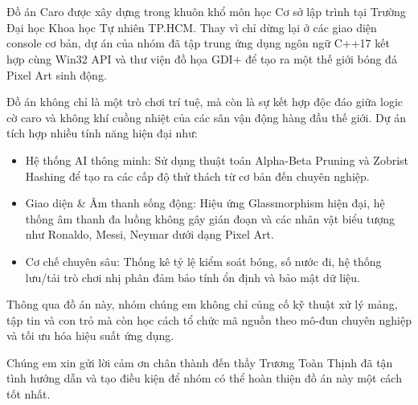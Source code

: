 \newpage
\chapter*{}

\noindent \indent Đồ án Caro được xây dựng trong khuôn khổ môn học Cơ sở lập trình tại Trường Đại học Khoa học Tự nhiên TP.HCM. Thay vì chỉ dừng lại ở các giao diện console cơ bản, dự án của nhóm đã tập trung ứng dụng ngôn ngữ C++17 kết hợp cùng Win32 API và thư viện đồ họa GDI+ để tạo ra một thế giới bóng đá Pixel Art sinh động.

Đồ án không chỉ là một trò chơi trí tuệ, mà còn là sự kết hợp độc đáo giữa logic cờ caro và không khí cuồng nhiệt của các sân vận động hàng đầu thế giới. Dự án tích hợp nhiều tính năng hiện đại như:
\begin{itemize}
    \item Hệ thống AI thông minh: Sử dụng thuật toán Alpha-Beta Pruning và Zobrist Hashing để tạo ra các cấp độ thử thách từ cơ bản đến chuyên nghiệp.

    \item Giao diện \& Âm thanh sống động: Hiệu ứng Glassmorphism hiện đại, hệ thống âm thanh đa luồng không gây gián đoạn và các nhân vật biểu tượng như Ronaldo, Messi, Neymar dưới dạng Pixel Art.

    \item Cơ chế chuyên sâu: Thống kê tỷ lệ kiểm soát bóng, số nước đi, hệ thống lưu/tải trò chơi nhị phân đảm bảo tính ổn định và bảo mật dữ liệu.
\end{itemize}

Thông qua đồ án này, nhóm chúng em không chỉ củng cố kỹ thuật xử lý mảng, tập tin và con trỏ mà còn học cách tổ chức mã nguồn theo mô-đun chuyên nghiệp và tối ưu hóa hiệu suất ứng dụng.

Chúng em xin gửi lời cảm ơn chân thành đến thầy Trương Toàn Thịnh đã tận tình hướng dẫn và tạo điều kiện để nhóm có thể hoàn thiện đồ án này một cách tốt nhất.
